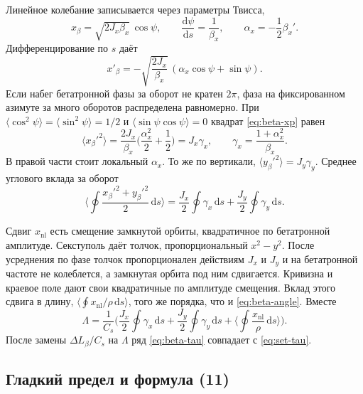 Линейное колебание записывается через параметры Твисса,
\begin{equation}
\label{eq:beta-xbeta}
x_\beta=\sqrt{2J_x\beta_x}\,\cos\psi,
\qquad
\frac{\mathrm{d}\psi}{\mathrm{d}s}=\frac{1}{\beta_x},
\qquad
\alpha_x=-\frac12\beta_x'.
\end{equation}
Дифференцирование по $s$ даёт
\begin{equation}
\label{eq:beta-xp}
x'_\beta
=-\sqrt{\frac{2J_x}{\beta_x}}\,(\alpha_x\cos\psi+\sin\psi).
\end{equation}
Если набег бетатронной фазы за оборот не кратен $2\pi$, фаза на фиксированном азимуте за много оборотов распределена равномерно. При $\langle\cos^2\psi\rangle=\langle\sin^2\psi\rangle=1/2$ и $\langle\sin\psi\cos\psi\rangle=0$ квадрат \eqref{eq:beta-xp} равен
\begin{equation}
\label{eq:beta-xp2}
\langle x_\beta'^2\rangle
=\frac{2J_x}{\beta_x}\Biggl(\frac{\alpha_x^2}{2}+\frac12\Biggr)
=J_x\gamma_x,
\qquad
\gamma_x=\frac{1+\alpha_x^2}{\beta_x}.
\end{equation}
В правой части стоит локальный $\alpha_x$. То же по вертикали, $\langle y_\beta'^2\rangle=J_y\gamma_y$. Среднее углового вклада за оборот
\begin{equation}
\label{eq:beta-angle}
\Biggl\langle\oint\frac{x_\beta'^2+y_\beta'^2}{2}\,\mathrm{d}s\Biggr\rangle
=\frac{J_x}{2}\oint\gamma_x\,\mathrm{d}s
+\frac{J_y}{2}\oint\gamma_y\,\mathrm{d}s.
\end{equation}

Сдвиг $x_{\mathrm{nl}}$ есть смещение замкнутой орбиты, квадратичное по бетатронной амплитуде. Секступоль даёт толчок, пропорциональный $x^2-y^2$. После усреднения по фазе толчок пропорционален действиям $J_x$ и $J_y$ и на бетатронной частоте не колеблется, а замкнутая орбита под ним сдвигается. Кривизна и краевое поле дают свои квадратичные по амплитуде смещения. Вклад этого сдвига в длину, $\langle\oint x_{\mathrm{nl}}/\rho\,\mathrm{d}s\rangle$, того же порядка, что и \eqref{eq:beta-angle}. Вместе
\begin{equation}
\label{eq:beta-Lambda}
\Lambda
=\frac{1}{C_s}\Biggl(
\frac{J_x}{2}\oint\gamma_x\,\mathrm{d}s
+\frac{J_y}{2}\oint\gamma_y\,\mathrm{d}s
+\Biggl\langle\oint\frac{x_{\mathrm{nl}}}{\rho}\,\mathrm{d}s\Biggr\rangle
\Biggr).
\end{equation}
После замены $\Delta L_\beta/C_s$ на $\Lambda$ ряд \eqref{eq:beta-tau} совпадает с \eqref{eq:set-tau}.

\subsection{Гладкий предел и формула (11)}
\label{sec:beta-smooth}

